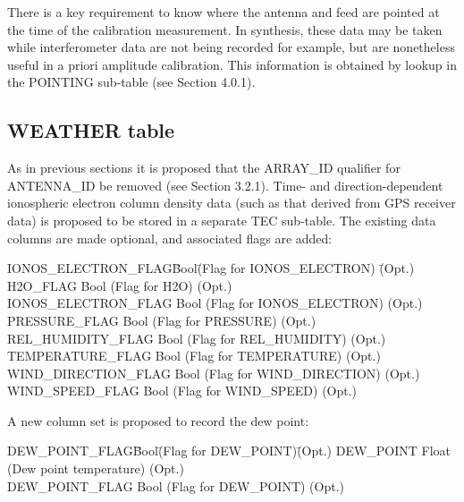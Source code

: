 \documentclass{article}
\begin{document}
There is a key requirement to know where the antenna and feed are
pointed at the time of the calibration measurement. In synthesis,
these data may be taken while interferometer data are not being
recorded for example, but are nonetheless useful in a priori amplitude
calibration. This information is obtained by lookup in the POINTING
sub-table (see Section 4.0.1).

\subsection{WEATHER table}

As in previous sections it is proposed that the ARRAY\_ID qualifier
for ANTENNA\_ID be removed (see Section 3.2.1). Time- and
direction-dependent ionospheric electron column density data (such as
that derived from GPS receiver data) is proposed to be stored in a
separate TEC sub-table. The existing data columns are made optional,
and associated flags are added:

\begin{tabbing}
IONOS\_ELECTRON\_FLAG\quad\quad \= Bool\quad\quad \= 
(Flag for IONOS\_ELECTRON) \quad\quad \= (Opt.) \\
H2O\_FLAG \> Bool \> (Flag for H2O) \> (Opt.) \\
IONOS\_ELECTRON\_FLAG \> Bool \> (Flag for IONOS\_ELECTRON) \> (Opt.) \\
PRESSURE\_FLAG \> Bool \> (Flag for PRESSURE) \> (Opt.) \\
REL\_HUMIDITY\_FLAG \> Bool \> (Flag for REL\_HUMIDITY) \> (Opt.) \\
TEMPERATURE\_FLAG \> Bool \> (Flag for TEMPERATURE) \> (Opt.) \\
WIND\_DIRECTION\_FLAG \> Bool \> (Flag for WIND\_DIRECTION) \> (Opt.) \\
WIND\_SPEED\_FLAG \> Bool \> (Flag for WIND\_SPEED) \> (Opt.) \\
\end{tabbing}

A new column set is proposed to record the dew point:

\begin{tabbing}
DEW\_POINT\_FLAG\quad\quad   \= Bool\quad\quad  \= 
(Flag for DEW\_POINT)\quad\quad \= (Opt.) \kill
DEW\_POINT \> Float \>  (Dew point temperature) \> (Opt.) \\
DEW\_POINT\_FLAG   \> Bool  \> (Flag for DEW\_POINT) \> (Opt.) \\
\end{tabbing}
\end{document}
